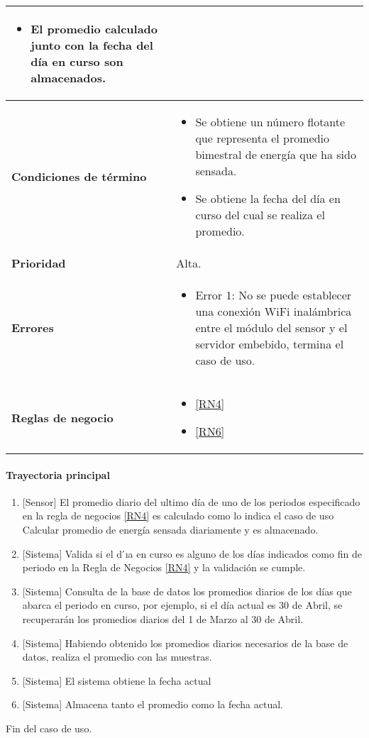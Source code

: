 \begin{longtable}{|J{5cm}|J{10.3cm}|}
		\begin{itemize}
			\item El promedio calculado junto con la fecha del día en curso son almacenados.
		\end{itemize}\\ \hline
	\textbf{Condiciones de término} & 
		\begin{itemize}
			\item Se obtiene un número flotante que representa el promedio bimestral de energía que ha sido sensada.
			\item Se obtiene la fecha del día en curso del cual se realiza el promedio.
		\end{itemize} \\ \hline 
	\textbf{Prioridad} & 
		Alta. \\ \hline
	\textbf{Errores} & 
		\begin{itemize}
			\item \label{SUB-M-CU1:Error1} Error 1: No se puede establecer una conexión WiFi inalámbrica entre el módulo del sensor y el servidor embebido, termina el caso de uso.
		\end{itemize} \\ \hline
	\textbf{Reglas de negocio} & 
		\begin{itemize}
			\item \ref{RN4}
			\item \ref{RN6}
		\end{itemize} \\ \hline

\end{longtable}

\paragraph{Trayectoria principal}
	\begin{enumerate}
		\item {[Sensor]} El promedio diario del ultimo día de uno de los periodos especificado en la regla de negocios \ref{RN4} es calculado como lo indica el caso de uso Calcular promedio de energía sensada diariamente y es almacenado.
		\item {[Sistema]} Valida si el d ́ıa en curso es alguno de los días indicados como fin de periodo en la Regla de Negocios \ref{RN4} y la validación se cumple.
		\item  {[Sistema]} Consulta de la base de datos los promedios diarios de los días que abarca el periodo en curso, por ejemplo, si el día actual es 30 de Abril, se recuperarán los promedios diarios del 1 de Marzo al 30 de Abril.
		\item {[Sistema]} Habiendo obtenido los promedios diarios necesarios de la base de datos, realiza el promedio con las muestras.
		\item {[Sistema]} El sistema obtiene la fecha actual
		\item {[Sistema]} Almacena tanto el promedio como la fecha actual.
	\end{enumerate}
	Fin del caso de uso.

